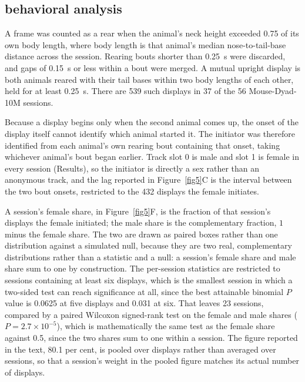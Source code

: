 \documentclass[pdflatex, sn-nature]{sn-jnl}
\theoremstyle{thmstyleone}%
\theoremstyle{thmstyletwo}%
\theoremstyle{thmstylethree}%
\begin{document}
\subsection{behavioral analysis}\label{methods-behavior}

A frame was counted as a rear when the animal's neck height exceeded 0.75 of its own body length, where body length is that animal's median nose-to-tail-base distance across the session. Rearing bouts shorter than 0.25~s were discarded, and gaps of 0.15~s or less within a bout were merged. A mutual upright display is both animals reared with their tail bases within two body lengths of each other, held for at least 0.25~s. There are 539 such displays in 37 of the 56 Mouse-Dyad-10M sessions.

Because a display begins only when the second animal comes up, the onset of the display itself cannot identify which animal started it. The initiator was therefore identified from each animal's own rearing bout containing that onset, taking whichever animal's bout began earlier. Track slot 0 is male and slot 1 is female in every session (Results), so the initiator is directly a sex rather than an anonymous track, and the lag reported in Figure~\ref{fig5}C is the interval between the two bout onsets, restricted to the 432 displays the female initiates.

A session's female share, in Figure~\ref{fig5}F, is the fraction of that session's displays the female initiated; the male share is the complementary fraction, $1$ minus the female share. The two are drawn as paired boxes rather than one distribution against a simulated null, because they are two real, complementary distributions rather than a statistic and a null: a session's female share and male share sum to one by construction. The per-session statistics are restricted to sessions containing at least six displays, which is the smallest session in which a two-sided test can reach significance at all, since the best attainable binomial $P$ value is 0.0625 at five displays and 0.031 at six. That leaves 23 sessions, compared by a paired Wilcoxon signed-rank test on the female and male shares ($P = 2.7 \times 10^{-5}$), which is mathematically the same test as the female share against 0.5, since the two shares sum to one within a session. The figure reported in the text, 80.1 per cent, is pooled over displays rather than averaged over sessions, so that a session's weight in the pooled figure matches its actual number of displays.
\end{document}

